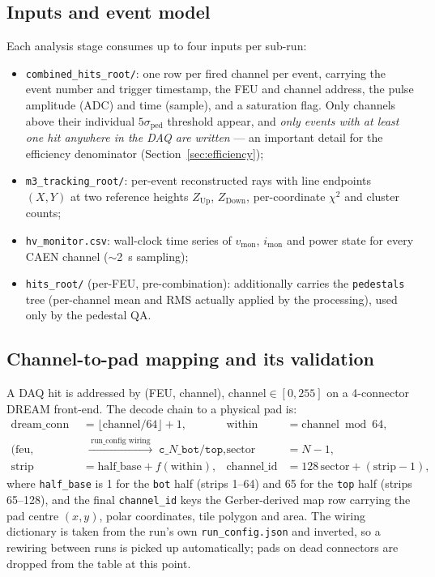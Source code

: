 \documentclass[11pt,a4paper]{article}
\newcommand{\code}[1]{\texttt{#1}}
\begin{document}
\subsection{Inputs and event model}

Each analysis stage consumes up to four inputs per sub-run:

\begin{itemize}[itemsep=2pt]
  \item \code{combined\_hits\_root/}: one row per fired channel per event,
        carrying the event number and trigger timestamp, the FEU and channel
        address, the pulse amplitude (ADC) and time (sample), and a
        saturation flag. Only channels above their individual
        $5\sigma_\text{ped}$ threshold appear, and \emph{only events with at
        least one hit anywhere in the DAQ are written} --- an important
        detail for the efficiency denominator (Section~\ref{sec:efficiency});
  \item \code{m3\_tracking\_root/}: per-event reconstructed rays with line
        endpoints $(X,Y)$ at two reference heights $Z_\text{Up}$,
        $Z_\text{Down}$, per-coordinate $\chi^2$ and cluster counts;
  \item \code{hv\_monitor.csv}: wall-clock time series of $v_\text{mon}$,
        $i_\text{mon}$ and power state for every CAEN channel
        ($\sim$\SI{2}{s} sampling);
  \item \code{hits\_root/} (per-FEU, pre-combination): additionally carries
        the \code{pedestals} tree (per-channel mean and RMS actually applied
        by the processing), used only by the pedestal QA.
\end{itemize}

\subsection{Channel-to-pad mapping and its validation}
\label{sec:mapping}

A DAQ hit is addressed by (FEU, channel), $\text{channel} \in [0,255]$ on a
4-connector DREAM front-end. The decode chain to a physical pad is:
%
\begin{align}
  \text{dream\_conn} &= \lfloor \text{channel}/64 \rfloor + 1, &
  \text{within} &= \text{channel} \bmod 64, \nonumber\\
  \text{(feu, dream\_conn)} &\;\xrightarrow{\;\text{run\_config wiring}\;}\;
  \code{c\_$N$\_bot/top}, &
  \text{sector} &= N-1, \nonumber\\
  \text{strip} &= \text{half\_base} + f(\text{within}), &
  \text{channel\_id} &= 128\,\text{sector} + (\text{strip}-1),
\end{align}
%
where \code{half\_base} is 1 for the \code{bot} half (strips 1--64) and 65
for the \code{top} half (strips 65--128), and the final
\code{channel\_id} keys the Gerber-derived map row carrying the pad centre
$(x,y)$, polar coordinates, tile polygon and area. The wiring dictionary is
taken from the run's own \code{run\_config.json} and inverted, so a rewiring
between runs is picked up automatically; pads on dead connectors are dropped
from the table at this point.
\end{document}
